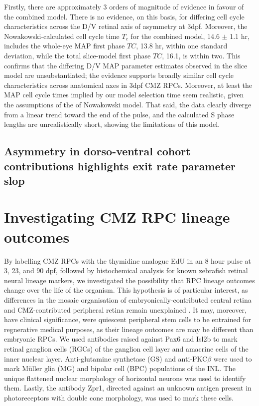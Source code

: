 Firstly, there are approximately 3 orders of magnitude of evidence in favour of the combined model. There is no evidence, on this basis, for differing cell cycle characteristics across the D/V retinal axis of asymmetry at 3dpf. Moreover, the Nowakowski-calculated cell cycle time $T_c$ for the combined model, 14.6 $\pm$ 1.1 hr, includes the whole-eye MAP first phase $TC$, 13.8 hr, within one standard deviation, while the total slice-model first phase $TC$, 16.1, is within two. This confirms that the differing D/V MAP parameter estimates observed in the slice model are unsubstantiated; the evidence supports broadly similar cell cycle characteristics across anatomical axes in 3dpf CMZ RPCs. Moreover, at least the MAP cell cycle times implied by our model selection time seem realistic, given the assumptions of the of Nowakowski model. That said, the data clearly diverge from a linear trend toward the end of the pulse, and the calculated S phase lengths are unrealistically short, showing the limitations of this model.

\subsection{Asymmetry in dorso-ventral cohort contributions highlights exit rate parameter slop}

\section{Investigating CMZ RPC lineage outcomes}

By labelling CMZ RPCs with the thymidine analogue EdU in an 8 hour pulse at 3, 23, and 90 dpf, followed by histochemical analysis for known zebrafish retinal neural lineage markers, we investigated the possibility that RPC lineage outcomes change over the life of the organism. This hypothesis is of particular interest, as differences in the mosaic organisation of embryonically-contributed central retina and CMZ-contributed peripheral retina remain unexplained \cite{Allison2010}. It may, moreover, have clinical significance, were quiescent peripheral stem cells to be entrained for regnerative medical purposes, as their lineage outcomes are may be different than embryonic RPCs.  We used antibodies raised against Pax6 and Isl2b to mark retinal ganglion cells (RGCs) of the ganglion cell layer and amacrine cells of the inner nuclear layer. Anti-glutamine synthetase (GS) and anti-PKC$\beta$ were used to mark M\"{u}ller glia (MG) and bipolar cell (BPC) populations of the INL. The unique flattened nuclear morphology of horizontal neurons was used to identify them. Lastly, the antibody Zpr1, directed against an unknown antigen present in photoreceptors with double cone morphology, was used to mark these cells.

